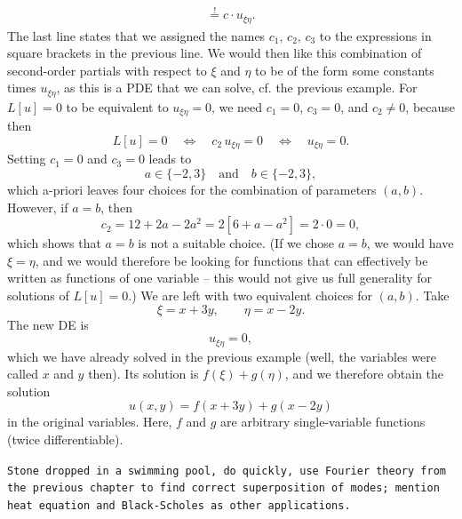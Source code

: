 \begin{example}
\begin{equation*}
\begin{split}
\stackrel{!}{=} c \cdot u_{\xi\eta}.
\end{split}
\end{equation*}
The last line states that we assigned the names $c_1,\,c_2,\,c_3$ to the expressions in square brackets in the previous line. We would then like this combination of second-order partials with respect to $\xi$ and $\eta$ to be of the form some constants times $u_{\xi\eta}$, as this is a PDE that we can solve, cf. the previous example. For $L[u]=0$ to be equivalent to $u_{\xi\eta}=0$, we need $c_1=0$, $c_3=0$, and $c_2\not=0$, because then
\[ L[u]=0 \quad \Longleftrightarrow \quad c_2\,u_{\xi\eta}=0
\quad \Longleftrightarrow \quad u_{\xi\eta}=0. \]
Setting $c_1=0$ and $c_3=0$ leads to
\[ a\in \{-2,3\} \quad \text{and} \quad b\in\{-2,3\},  \]
which a-priori leaves four choices for the combination of parameters $(a,b)$. However, if $a=b$, then
\[ c_2 = 12+2a-2a^2 = 2[6+a-a^2]=2 \cdot 0 = 0, \]
which shows that $a=b$ is not a suitable choice. (If we chose $a=b$, we would have $\xi=\eta$, and we would therefore be looking for functions that can effectively be written as functions of one variable -- this would not give us full generality for solutions of $L[u]=0$.) We are left with two equivalent choices for $(a,b)$. Take 
\[ \xi = x+3y, \qquad \eta = x-2y. \]
The new DE is
\[ u_{\xi\eta} = 0, \]
which we have already solved in the previous example (well, the variables were called $x$ and $y$ then). Its solution is $f(\xi)+g(\eta)$, and we therefore obtain the solution
\[ u(x,y) = f(x+3y)+g(x-2y) \]
in the original variables. Here, $f$ and $g$ are arbitrary single-variable functions (twice differentiable).
\end{example}

\begin{application}
\texttt{Stone dropped in a swimming pool, do quickly, use Fourier theory from the previous chapter to find correct superposition of modes; mention heat equation and Black-Scholes as other applications.}
\end{application}

